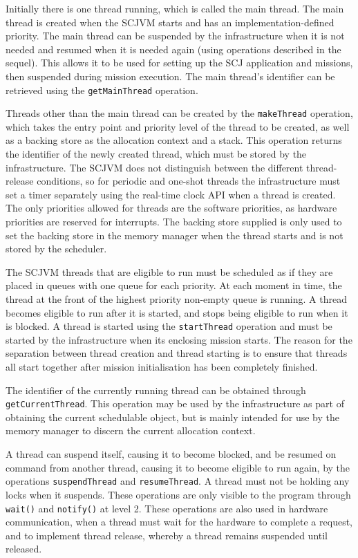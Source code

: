 \documentclass[a4paper,10pt]{report}
\begin{document}
Initially there is one thread running, which is called the main
thread.
The main thread is created when the SCJVM starts and has an
implementation-defined priority.
The main thread can be suspended by the infrastructure when it is not
needed and resumed when it is needed again (using operations described
in the sequel).
This allows it to be used for setting up the SCJ application and
missions, then suspended during mission execution.
The main thread's identifier can be retrieved using the
\texttt{get\-Main\-Thread} operation.

Threads other than the main thread can be created by the
\texttt{make\-Thread} operation, which takes the entry point and
priority level of the thread to be created, as well as a backing store
as the allocation context and a stack.
This operation returns the identifier of the newly created thread,
which must be stored by the infrastructure.
The SCJVM does not distinguish between the different thread-release
conditions, so for periodic and one-shot threads the infrastructure
must set a timer separately using the real-time clock API when a
thread is created.
The only priorities allowed for threads are the software priorities,
as hardware priorities are reserved for interrupts.
The backing store supplied is only used to set the backing store in
the memory manager when the thread starts and is not stored by the
scheduler.

The SCJVM threads that are eligible to run must be scheduled as if
they are placed in queues with one queue for each priority.
At each moment in time, the thread at the front of the highest
priority non-empty queue is running.
A thread becomes eligible to run after it is started, and stops being
eligible to run when it is blocked.
A thread is started using the \texttt{start\-Thread} operation and
must be started by the infrastructure when its enclosing mission
starts.
The reason for the separation between thread creation and thread
starting is to ensure that threads all start together after mission
initialisation has been completely finished.

The identifier of the currently running thread can be obtained through
\texttt{get\-Current\-Thread}.
This operation may be used by the infrastructure as part of obtaining
the current schedulable object, but is mainly intended for use by the
memory manager to discern the current allocation context.

A thread can suspend itself, causing it to become blocked, and be
resumed on command from another thread, causing it to become eligible
to run again, by the operations \texttt{suspend\-Thread} and
\texttt{resume\-Thread}.
A thread must not be holding any locks when it suspends.
These operations are only visible to the program through
\texttt{wait()} and \texttt{notify()} at level 2.
These operations are also used in hardware communication, when a
thread must wait for the hardware to complete a request, and to
implement thread release, whereby a thread remains suspended until
released.
\end{document}
